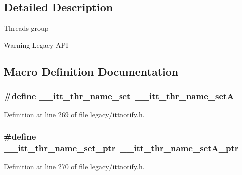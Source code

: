 \subsection{Detailed Description}
Threads group \begin{DoxyWarning}{Warning}
Legacy A\-P\-I 
\end{DoxyWarning}


\subsection{Macro Definition Documentation}
\hypertarget{group__legacy__threads_ga01a4106860d96c6d77c31b3e35e7c5ac}{
\subsubsection[{\-\_\-\-\_\-itt\-\_\-thr\-\_\-name\-\_\-set}]{\setlength{\rightskip}{0pt plus 5cm}\#define \-\_\-\-\_\-itt\-\_\-thr\-\_\-name\-\_\-set~{\bf \-\_\-\-\_\-itt\-\_\-thr\-\_\-name\-\_\-set\-A}}}\label{group__legacy__threads_ga01a4106860d96c6d77c31b3e35e7c5ac}


Definition at line 269 of file legacy/ittnotify.\-h.

\hypertarget{group__legacy__threads_gaa3690d1b081fe1b2e6b47778f51a2904}{
\subsubsection[{\-\_\-\-\_\-itt\-\_\-thr\-\_\-name\-\_\-set\-\_\-ptr}]{\setlength{\rightskip}{0pt plus 5cm}\#define \-\_\-\-\_\-itt\-\_\-thr\-\_\-name\-\_\-set\-\_\-ptr~\-\_\-\-\_\-itt\-\_\-thr\-\_\-name\-\_\-set\-A\-\_\-ptr}}\label{group__legacy__threads_gaa3690d1b081fe1b2e6b47778f51a2904}


Definition at line 270 of file legacy/ittnotify.\-h.



